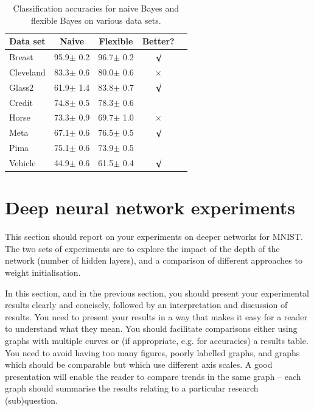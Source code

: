 \documentclass{article}
\begin{document}
\begin{table}[tb]
\vskip 3mm
\begin{center}
\begin{small}
\begin{sc}
\begin{tabular}{lcccr}
\hline
\abovespace\belowspace
Data set & Naive & Flexible & Better? \\
\hline
\abovespace
Breast    & 95.9$\pm$ 0.2& 96.7$\pm$ 0.2& $\surd$ \\
Cleveland & 83.3$\pm$ 0.6& 80.0$\pm$ 0.6& $\times$\\
Glass2    & 61.9$\pm$ 1.4& 83.8$\pm$ 0.7& $\surd$ \\
Credit    & 74.8$\pm$ 0.5& 78.3$\pm$ 0.6&         \\
Horse     & 73.3$\pm$ 0.9& 69.7$\pm$ 1.0& $\times$\\
Meta      & 67.1$\pm$ 0.6& 76.5$\pm$ 0.5& $\surd$ \\
Pima      & 75.1$\pm$ 0.6& 73.9$\pm$ 0.5&         \\
\belowspace
Vehicle   & 44.9$\pm$ 0.6& 61.5$\pm$ 0.4& $\surd$ \\
\hline
\end{tabular}
\end{sc}
\end{small}
\caption{Classification accuracies for naive Bayes and flexible 
Bayes on various data sets.}
\label{tab:sample-table}
\end{center}
\vskip -3mm
\end{table}

\section{Deep neural network experiments}
\label{sec:dnnexpts}
This section should report on your experiments on deeper networks for MNIST.  The two sets of experiments are to explore the impact of the depth of the network (number of hidden layers), and a comparison of different approaches to weight initialisation.

In this section, and in the previous section, you should present your experimental results clearly and concisely, followed by an interpretation and discussion of results. You need to present your results in a way that makes it easy for a reader to understand what they mean. You should facilitate comparisons either using graphs with multiple curves or (if appropriate, e.g. for accuracies) a results table. You need to avoid having too many figures, poorly labelled graphs, and graphs which should be comparable but which use different axis scales. A good presentation will enable the reader to compare trends in the same graph -- each graph should summarise the results relating to a particular research (sub)question.
\end{document}
